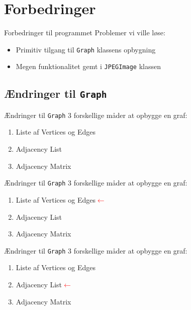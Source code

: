 \section{Forbedringer}
\begin{frame}{Forbedringer til programmet}{}
	Problemer vi ville løse:
	\begin{itemize}
		\item Primitiv tilgang til \lstinline|Graph| klassens opbygning
		\item Megen funktionalitet gemt i \lstinline|JPEGImage| klassen
	\end{itemize}
\end{frame}

\subsection{Ændringer til \lstinline|Graph|}
\begin{frame}{Ændringer til \lstinline|Graph|}{}
	3 forskellige måder at opbygge en graf:
	\begin{enumerate}
		\item Liste af Vertices og Edges
		\item Adjacency List
		\item Adjacency Matrix
	\end{enumerate}
\end{frame}
\begin{frame}[noframenumbering]{Ændringer til \lstinline|Graph|}{}
	3 forskellige måder at opbygge en graf:
	\begin{enumerate}
		\item Liste af Vertices og Edges\textcolor{red}{$\leftarrow$}
		\item Adjacency List
		\item Adjacency Matrix
	\end{enumerate}
\end{frame}
\begin{frame}[noframenumbering]{Ændringer til \lstinline|Graph|}{}
	3 forskellige måder at opbygge en graf:
	\begin{enumerate}
		\item Liste af Vertices og Edges
		\item Adjacency List\textcolor{red}{$\leftarrow$}
		\item Adjacency Matrix
	\end{enumerate}
\end{frame}